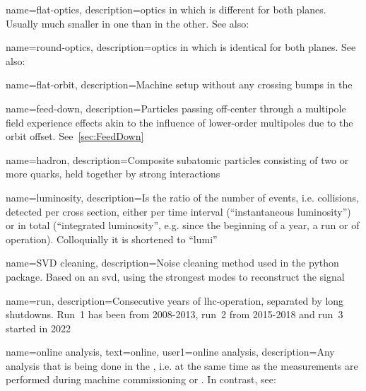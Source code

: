 {
        name=flat-optics,
        description={\Gls{optics} in which  is different for both planes. 
        Usually much smaller in one than in the other. 
        See also: }
}

{
        name=round-optics,
        description={\Gls{optics} in which  is identical for both planes.
        See also: } 
}

{
        name=flat-orbit,
        description={Machine setup without any crossing bumps in the }
}

{
        name=feed-down,
        description={Particles passing off-center through a multipole field experience effects 
        akin to the influence of lower-order multipoles due to the orbit offset.
        See~\cref{sec:FeedDown}%
        }
}

{
        name=hadron,
        description={Composite subatomic particles consisting of two or more quarks,
        held together by strong interactions}
}

{
        name=luminosity,
        description={Is the ratio of the number of events, i.e. collisions, detected per cross section,
        either per time interval (``instantaneous luminosity'') or in total 
        (``integrated luminosity'', e.g. since the beginning of a year, a \gls{run} or of operation).
        Colloquially it is shortened to ``lumi''}
}

{
        name={SVD cleaning},
        description={Noise cleaning method used in the  python package. 
        Based on an \acrfull{svd}, using the strongest modes to reconstruct the signal}
}

{
        name={run},
        description={Consecutive years of \acrshort{lhc}-operation, separated by 
        long shutdowns. Run~1 has been from 2008-2013, run~2 from 2015-2018 and run~3 started in 2022}
}

{
        name={online analysis},
        text=online,
        user1={online analysis},
        description={Any analysis that is being done in the , 
        i.e. at the same time as the measurements are performed during machine commissioning or .
        In contrast, see: }
}

